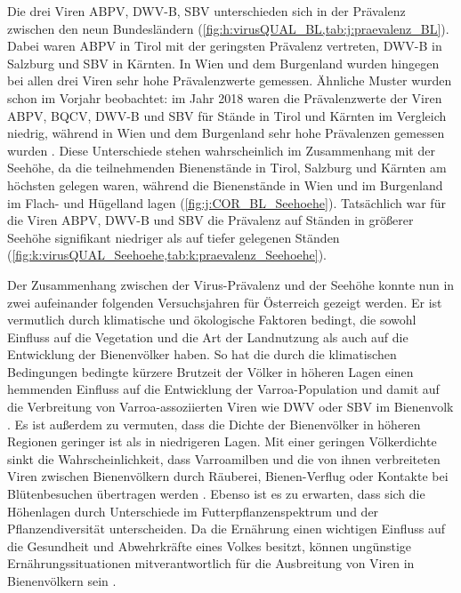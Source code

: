 Die drei Viren ABPV, DWV-B, SBV unterschieden sich in der Prävalenz zwischen den neun Bundesländern (\cref{fig:h:virusQUAL_BL,tab:j:praevalenz_BL}). Dabei waren ABPV in Tirol mit der geringsten Prävalenz vertreten, DWV-B in Salzburg und SBV in Kärnten. In Wien und dem Burgenland wurden hingegen bei allen drei Viren sehr hohe Prävalenzwerte gemessen. Ähnliche Muster wurden schon im Vorjahr beobachtet: im Jahr 2018 waren die Prävalenzwerte der Viren ABPV, BQCV, DWV-B und SBV für Stände in Tirol und Kärnten im Vergleich niedrig, während in Wien und dem Burgenland sehr hohe Prävalenzen gemessen wurden \citep{brodschneider2019b}. Diese Unterschiede stehen wahrscheinlich im Zusammenhang mit der Seehöhe, da die teilnehmenden Bienenstände in Tirol, Salzburg und Kärnten am höchsten gelegen waren, während die Bienenstände in Wien und im Burgenland im Flach- und Hügelland lagen (\cref{fig:j:COR_BL_Seehoehe}). Tatsächlich war für die Viren ABPV, DWV-B und SBV die Prävalenz auf Ständen in größerer Seehöhe signifikant niedriger als auf tiefer gelegenen Ständen (\cref{fig:k:virusQUAL_Seehoehe,tab:k:praevalenz_Seehoehe}).

Der Zusammenhang zwischen der Virus-Prävalenz und der Seehöhe konnte nun in zwei aufeinander folgenden Versuchsjahren für Österreich gezeigt werden. Er ist vermutlich durch klimatische und ökologische Faktoren bedingt, die sowohl Einfluss auf die Vegetation und die Art der Landnutzung als auch auf die Entwicklung der Bienenvölker haben. So hat die durch die klimatischen Bedingungen bedingte kürzere Brutzeit der Völker in höheren Lagen einen hemmenden Einfluss auf die Entwicklung der Varroa-Population und damit auf die Verbreitung von Varroa-assoziierten Viren wie DWV oder SBV im Bienenvolk \citep{mcmenamin2015,sumpter2004}. Es ist außerdem zu vermuten, dass die Dichte der Bienenvölker in höheren Regionen geringer ist als in niedrigeren Lagen. Mit einer geringen Völkerdichte sinkt die Wahrscheinlichkeit, dass Varroamilben und die von ihnen verbreiteten Viren zwischen Bienenvölkern durch Räuberei, Bienen-Verflug oder Kontakte bei Blütenbesuchen übertragen werden \citep{forfert2015,forfert2016,nolan2016,peck2016}. Ebenso ist es zu erwarten, dass sich die Höhenlagen durch Unterschiede im Futterpflanzenspektrum und der Pflanzendiversität unterscheiden. Da die Ernährung einen wichtigen Einfluss auf die Gesundheit und Abwehrkräfte eines Volkes besitzt, können ungünstige Ernährungssituationen mitverantwortlich für die Ausbreitung von Viren in Bienenvölkern sein \citep{alaux2011,degrandi-hoffman2015}.

